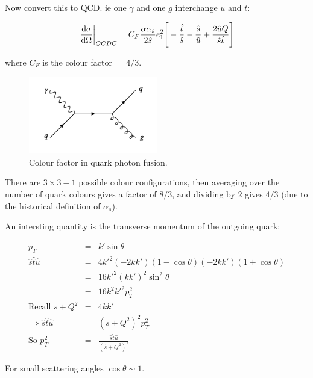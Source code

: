 Now convert this to QCD.  ie one $\gamma$ and one $g$ interchange $u$ and $t$:

\[
  \left.\frac{\mathrm{d}\sigma}{\mathrm{d}\Omega}\right|_{QCDC} = C_F\frac{\alpha\alpha_s}{2\hat{s}}e_1^2\Bigg[ -\frac{\hat{t}}{\hat{s}} - \frac{\hat{s}}{\hat{u}} + \frac{2\hat{u}Q}{\hat{s}\hat{t}} \Bigg] 
\]

where $C_F$ is the colour factor $= 4/3$.

\begin{figure}[!htb]
  \begin{center}
    \includegraphics[width=0.5\textwidth]{images/web_feynman/image_72.png}
    \caption[Colour factor in quark photon fusion]{Colour factor in quark photon fusion.}
    \label{fig:ch14_QGammaToQGColour}
  \end{center}
\end{figure}

There are $3\times3-1$ possible colour configurations, then averaging over the number of quark colours gives a factor of $8/3$, and dividing by $2$ gives $4/3$ (due to the historical definition of $\alpha_s$).

An intersting quantity is the transverse momentum of the outgoing quark:

\begin{eqnarray*}
  p_T & = & k'\sin\theta \\
  \hat{s}\hat{t}\hat{u} & = & 4k'^2\left(-2kk'\right)\left(1 - \cos\theta\right)\left(-2kk'\right)\left(1 + \cos\theta\right) \\
  & = & 16k'^2\left(kk'\right)^2\sin^2\theta \\
  & = & 16k^2k'^2p_T^2 \\
  \textrm{Recall } s + Q^2 & = & 4kk' \\
  \Rightarrow \hat{s}\hat{t}\hat{u} & = & \left(s + Q^2\right)^2p_T^2 \\
  \textrm{So } p_T^2 & = & \frac{\hat{s}\hat{t}\hat{u}}{\left(\hat{s} + Q^2\right)^2}
\end{eqnarray*}

For small scattering angles $\cos\theta\sim 1$.

